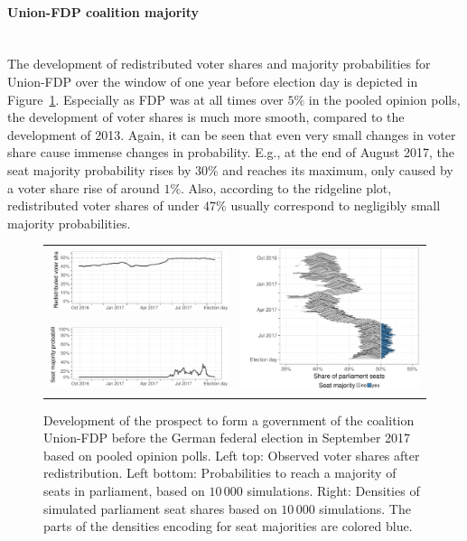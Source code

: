 \documentclass[smallcondensed]{svjour3}     %
\begin{document}
\paragraph{Union-FDP coalition majority} \ \\
The development of redistributed voter shares and majority probabilities
for Union-FDP over the window of one year before election day
is depicted in Figure~\ref{fig:2017_cdufdp}.
Especially as FDP was at all times over $5\%$ in the pooled opinion polls,
the development of voter shares is much more smooth, compared to 
the development of 2013.
Again, it can be seen that even very small changes in voter share
cause immense changes in probability. E.g., at the end of August 2017,
the seat majority probability rises by $30\%$ and reaches its
maximum, only caused by a voter share rise of around $1\%$.
Also, according to the ridgeline plot, redistributed voter shares of under
$47\%$ usually correspond to negligibly small majority probabilities.

\begin{figure}[H]\centering
\begin{tabular}{ll}
\includegraphics[height=.15\textwidth]{figures/2017_pooled_cdufdp_rawSharesRedist.pdf}
&
\multirow{2}{*}[13ex]{\includegraphics[height=30ex]{figures/2017_pooled_cdufdp_ridgeline.pdf}}
\\
\includegraphics[height=.15\textwidth]{figures/2017_pooled_cdufdp_prob.pdf}
\end{tabular}
\caption{Development of the prospect to form a government of the coalition Union-FDP before the German federal election in September 2017 based on pooled opinion polls.
Left top: Observed voter shares after redistribution. Left bottom: Probabilities to reach a majority of seats in parliament, based on $10\,000$ simulations. Right: Densities of simulated parliament seat shares based on $10\,000$ simulations. The parts of the densities encoding for seat majorities are colored blue.
\label{fig:2017_cdufdp}
}
\end{figure}
\end{document}
